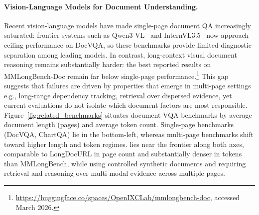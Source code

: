\paragraph{Vision-Language Models for Document Understanding.}
Recent vision-language models have made single-page document QA increasingly saturated: frontier systems such as Qwen3-VL~\citep{bai2025qwen3} and InternVL3.5~\citep{wang2025internvl3} now approach ceiling performance on DocVQA, so these benchmarks provide limited diagnostic separation among leading models. In contrast, long-context visual document reasoning remains substantially harder: the best reported results on MMLongBench-Doc remain far below single-page performance.\footnote{\url{https://huggingface.co/spaces/OpenIXCLab/mmlongbench-doc}, accessed March 2026.} This gap suggests that failures are driven by properties that emerge in multi-page settings e.g., long-range dependency tracking, retrieval over dispersed evidence, yet current evaluations do not isolate which document factors are most responsible. Figure~\ref{fig:related_benchmarks} situates document VQA benchmarks by average document length (pages) and average token count. Single-page benchmarks (DocVQA, ChartQA) lie in the bottom-left, whereas multi-page benchmarks shift toward higher length and token regimes. \synthdocbench{} lies near the frontier along both axes, comparable to LongDocURL in page count and substantially denser in tokens than MMLongBench, while using controlled synthetic documents and requiring retrieval and reasoning over multi-modal evidence across multiple pages.


